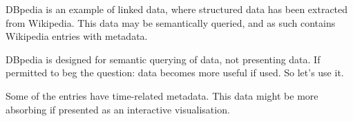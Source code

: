 DBpedia is an example of linked data, where structured data has been extracted 
from Wikipedia. This data may be semantically queried, and as such contains 
Wikipedia entries with metadata\cite{bizer2009dbpedia}.

DBpedia is designed for semantic querying of data, not presenting data. If 
permitted to beg the question: data becomes more useful if used. So let's use 
it.

Some of the entries have time-related metadata. This data might be more 
absorbing if presented as an interactive visualisation.
